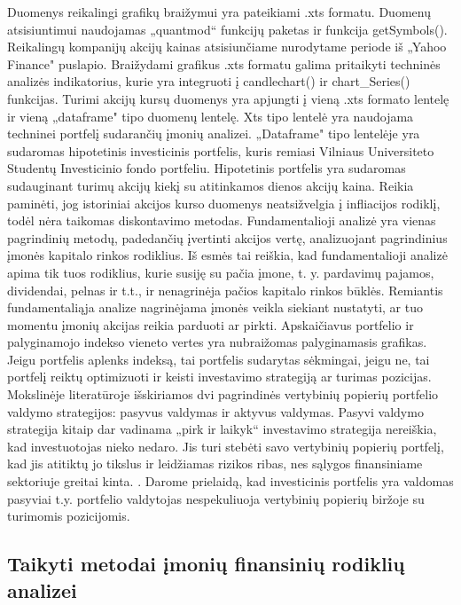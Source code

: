 \documentclass[12pt]{article}
\begin{document}
Duomenys reikalingi grafikų braižymui yra pateikiami .xts formatu. Duomenų atsisiuntimui naudojamas „quantmod“ funkcijų paketas ir funkcija getSymbols(). Reikalingų kompanijų akcijų kainas atsisiunčiame nurodytame periode iš „Yahoo Finance" puslapio. Braižydami grafikus .xts formatu galima pritaikyti techninės analizės indikatorius, kurie yra integruoti į candlechart() ir chart\_Series() funkcijas. Turimi akcijų kursų duomenys yra apjungti į vieną .xts formato lentelę ir vieną „dataframe" tipo duomenų lentelę. Xts tipo lentelė yra naudojama techninei portfelį sudarančių įmonių analizei. „Dataframe" tipo lentelėje yra sudaromas hipotetinis investicinis portfelis, kuris remiasi Vilniaus Universiteto Studentų Investicinio fondo portfeliu. Hipotetinis portfelis yra sudaromas sudauginant turimų akcijų kiekį su atitinkamos dienos akcijų kaina. Reikia paminėti, jog istoriniai akcijos kurso duomenys neatsižvelgia į infliacijos rodiklį, todėl nėra taikomas diskontavimo metodas. Fundamentalioji analizė yra vienas pagrindinių metodų, padedančių įvertinti akcijos vertę, analizuojant pagrindinius įmonės kapitalo rinkos rodiklius. Iš esmės tai reiškia, kad fundamentalioji analizė apima tik tuos rodiklius, kurie susiję su pačia įmone, t. y. pardavimų pajamos, dividendai, pelnas ir t.t., ir nenagrinėja pačios kapitalo rinkos būklės. Remiantis fundamentaliąja analize nagrinėjama įmonės veikla siekiant nustatyti, ar tuo momentu
įmonių akcijas reikia parduoti ar pirkti. \cite{cibulskiene2006fundamentiniku}
Apskaičiavus portfelio ir palyginamojo indekso vieneto vertes yra nubraižomas palyginamasis grafikas. Jeigu portfelis aplenks indeksą, tai portfelis sudarytas sėkmingai, jeigu ne, tai portfelį reiktų optimizuoti ir keisti investavimo strategiją ar turimas pozicijas. Mokslinėje literatūroje išskiriamos dvi pagrindinės vertybinių popierių portfelio valdymo strategijos: pasyvus valdymas ir aktyvus valdymas. Pasyvi valdymo strategija kitaip dar vadinama „pirk ir laikyk“ investavimo strategija nereiškia, kad investuotojas nieko nedaro. Jis turi stebėti savo vertybinių popierių portfelį, kad jis atitiktų jo tikslus ir leidžiamas rizikos ribas, nes sąlygos finansiniame sektoriuje greitai kinta. \cite{lileikiene2010akcijku}. Darome prielaidą, kad investicinis portfelis yra valdomas pasyviai t.y. portfelio valdytojas nespekuliuoja vertybinių popierių biržoje su turimomis pozicijomis.


\subsection{Taikyti metodai įmonių finansinių rodiklių analizei}
\end{document}
